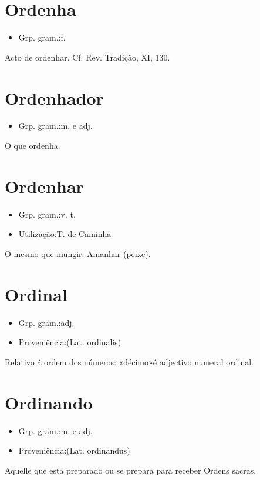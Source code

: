 \section{Ordenha}
\begin{itemize}
\item {Grp. gram.:f.}
\end{itemize}
Acto de ordenhar. Cf. Rev. \textunderscore Tradição\textunderscore , XI, 130.
\section{Ordenhador}
\begin{itemize}
\item {Grp. gram.:m.  e  adj.}
\end{itemize}
O que ordenha.
\section{Ordenhar}
\begin{itemize}
\item {Grp. gram.:v. t.}
\end{itemize}
\begin{itemize}
\item {Utilização:T. de Caminha}
\end{itemize}
O mesmo que \textunderscore mungir\textunderscore .
Amanhar (peixe).
\section{Ordinal}
\begin{itemize}
\item {Grp. gram.:adj.}
\end{itemize}
\begin{itemize}
\item {Proveniência:(Lat. \textunderscore ordinalis\textunderscore )}
\end{itemize}
Relativo á ordem dos números: \textunderscore «décimo»é adjectivo numeral ordinal\textunderscore .
\section{Ordinando}
\begin{itemize}
\item {Grp. gram.:m.  e  adj.}
\end{itemize}
\begin{itemize}
\item {Proveniência:(Lat. \textunderscore ordinandus\textunderscore )}
\end{itemize}
Aquelle que está preparado ou se prepara para receber Ordens sacras.
